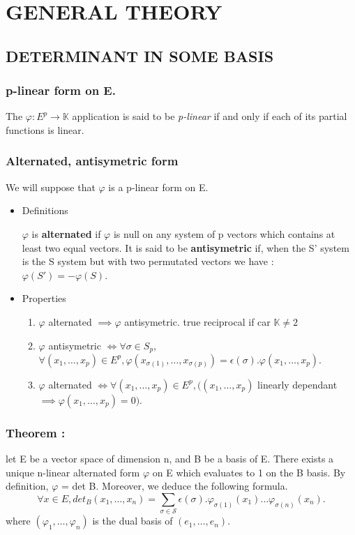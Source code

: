 \documentclass[a4paper,12pt]{article}
\title{\letitle}
\author{\leauthor}
\date{}
\begin{document}
    \section{GENERAL THEORY}

\subsection{DETERMINANT IN SOME BASIS}

\subsubsection{p-linear form on E.}

The $\varphi:E^p \rightarrow \mathbb{K}$ application is said to be {\it p-linear}
if and only if each of its partial functions is linear.

\subsubsection{Alternated, antisymetric form}

We will suppose that $\varphi$ is a p-linear form on E.
\begin{itemize}
\item Definitions


$\varphi$ is \textbf{ alternated } if $\varphi$ is null on any system of p vectors which contains at least
two equal vectors. It is said to be \textbf{ antisymetric } if, when the S' system is the S system but
with two permutated vectors we have : $\varphi(S')=-\varphi(S)$.

\item Properties

\begin{enumerate}
\item $\varphi$ alternated $\implies \varphi$ antisymetric. true reciprocal if car $\mathbb{K}\neq 2$

\item $\varphi$ 
antisymetric
$\iff \forall \sigma \in S_p$, $\forall (x_1,\hdots,x_p) 
\in E^p, \varphi(x_{\sigma(1)},\hdots,x_{\sigma(p)})=\epsilon (\sigma).\varphi(x_1,\hdots,x_p)$.

\item $\varphi$ 
alternated
$\iff \forall (x_1,\hdots,x_p)\in E^p, ((x_1,\hdots,x_p)$
linearly dependant
$\implies \varphi (x_1,\hdots,x_p) = 0)$.
\end{enumerate}
\end{itemize}

\subsubsection{\textbf{Theorem :}}
let E be a vector space of dimension n, and B be a basis of E. There exists a unique n-linear alternated form
$\varphi$ on E which evaluates to 1 on the B basis. By definition, $\varphi$ = det B.
Moreover, we deduce the following formula.
\begin{equation}\forall x \in E, det_B(x_1,\hdots,x_n)=\sum_{\sigma \in \mathcal{S}} 
\epsilon (\sigma).\varphi_{\sigma(1)}(x_1)\hdots \varphi_{\sigma(n)}(x_n).\end{equation}
where $(\varphi_1,\hdots,\varphi_n)$ is the dual basis of $(e_1,\hdots,e_n)$.
\end{document}
